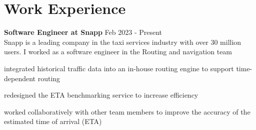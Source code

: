 
\section{Work Experience}
\textbf{Software Engineer at Snapp} \hfill Feb 2023 - Present  \\
Snapp is a leading company in the taxi services industry with over 30 million users. I worked as a software engineer in the Routing and navigation team 
\begin{compactitem} 
\item integrated historical traffic data into an in-house routing engine to support time-dependent routing
\item redesigned the ETA benchmarking service to increase efficiency 
\item worked collaboratively with other team members to improve the accuracy of the estimated time of arrival (ETA) 
\end{compactitem} 
